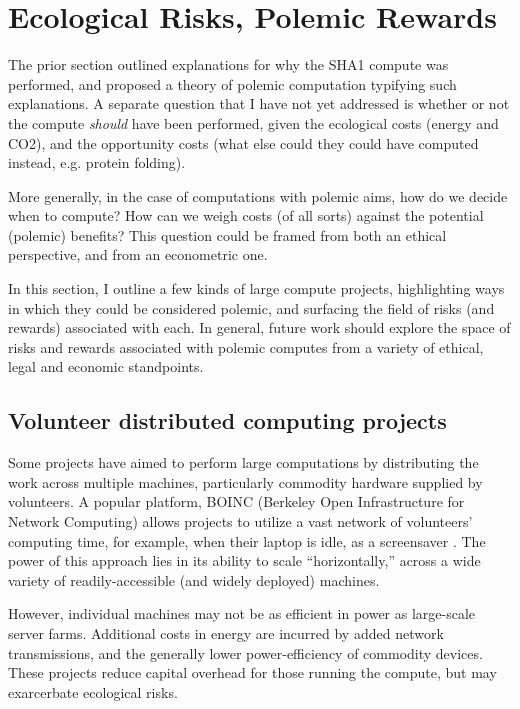 \documentclass[sigconf]{acmart}
\begin{document}
\section{Ecological Risks, Polemic Rewards}
\label{sec:org5a32850}

The prior section outlined explanations for why the SHA1 compute was performed, 
and proposed a theory of polemic computation typifying such explanations.
A separate question that I have not yet addressed 
is whether or not the compute \emph{should} have been performed,
given the ecological costs (energy and CO2), and the opportunity costs (what else could they could have computed instead, e.g. protein folding). 

More generally, in the case of computations with polemic aims,
how do we decide when to compute?
How can we weigh costs (of all sorts) against the potential (polemic) benefits?
This question could be framed from both an ethical perspective, 
and from an econometric one.

In this section, I outline a few kinds of large compute projects, 
highlighting ways in which they could be considered polemic,
and surfacing the field of risks (and rewards) associated with each.
In general, future work should explore the space of risks and rewards
associated with polemic computes from a variety of ethical, legal and economic standpoints.

\subsection{Volunteer distributed computing projects}
\label{sec:org4674bd4}

Some projects have aimed to perform large computations by distributing the work across multiple machines,
particularly commodity hardware supplied by volunteers.
A popular platform, BOINC (Berkeley Open Infrastructure for Network Computing)
allows projects to utilize a vast network of volunteers' computing time, 
for example, when their laptop is idle, as a screensaver
\cite{Anderson2004}.
The power of this approach lies in its ability to scale ``horizontally,''
across a wide variety of readily-accessible (and widely deployed) machines.

However, individual machines may not be as efficient in power 
as large-scale server farms.
Additional costs in energy are incurred by added network transmissions,
and the generally lower power-efficiency of commodity devices.
These projects reduce capital overhead for those running the compute,
but may exarcerbate ecological risks.
\end{document}

